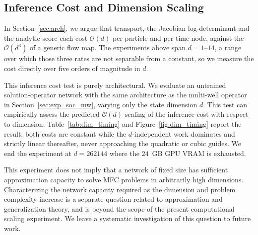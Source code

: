 \documentclass[preprint]{elsarticle}
\begin{document}
\subsection{Inference Cost and Dimension Scaling}
\label{sec:exp_complexity}

In Section~\ref{sec:arch}, we argue that transport, the Jacobian log-determinant and the analytic score each cost $\mathcal O(d)$ per particle and per time node, against the $\mathcal O(d^3)$ of a generic flow map. The experiments above span $d=1$--$14$, a range over which those three rates are not separable from a constant, so we measure the cost directly over five orders of magnitude in $d$.

This inference cost test is purely architectural. We evaluate an untrained solution-operator network with the same architecture as the multi-well operator in Section~\ref{sec:exp_soc_mw}, varying only the state dimension \(d\). This test can empirically assess the predicted $\mathcal O(d)$ scaling of the inference cost with respect to dimension. Table~\ref{tab:dim_timing} and Figure~\ref{fig:dim_timing} report the result: both costs are constant while the $d$-independent work dominates and strictly linear thereafter, never approaching the quadratic or cubic guides. We end the experiment at $d=262144$ where the $24$~GB GPU VRAM is exhausted.

This experiment does not imply that a network of fixed size has sufficient approximation capacity to solve MFC problems in arbitrarily high dimensions. Characterizing the network capacity required as the dimension and problem complexity increase is a separate question related to approximation and generalization theory, and is beyond the scope of the present computational scaling experiment. We leave a systematic investigation of this question to future work.
\end{document}
